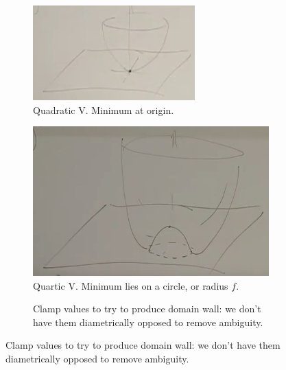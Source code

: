 \documentclass[]{article}
\begin{document}
\begin{figure}[H]
	\caption{Potentials}\label{fig:s-7-potentials}
	\begin{subfigure}{0.4\textwidth}
		\caption{Quadratic V. Minimum at origin.}\label{fig:2-7-V-quad}
		\includegraphics[width=\textwidth]{2-7-V-quad}
	\end{subfigure}
	\begin{subfigure}{0.4\textwidth}
		\caption{Quartic V. Minimum lies on a circle, or radius $f$.}\label{sig:2-7-V-quartic}
		\includegraphics[width=\textwidth]{2-7-V-quartic}
	\end{subfigure}
	\begin{subfigure}{0.9\textwidth}
		\begin{center}
			\caption{Clamp values to try to produce domain wall: we don't have them diametrically opposed to remove ambiguity.}\label{fig:2-7-V-quartic-domain-wall}

\end{center}
\end{subfigure}
\end{figure}
\end{document}
